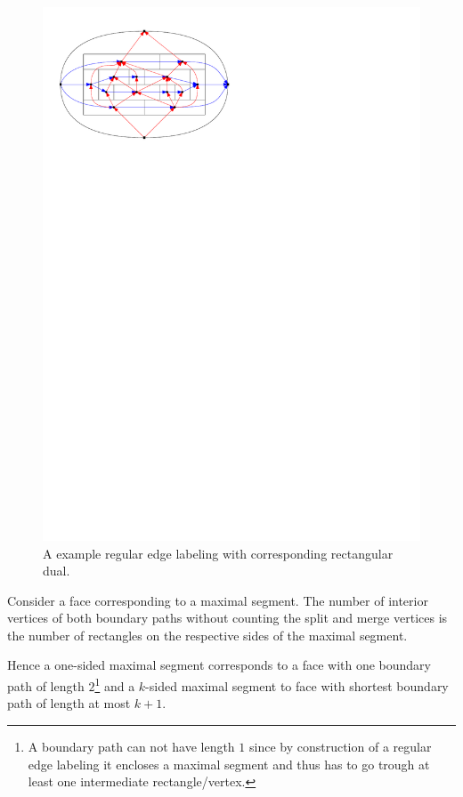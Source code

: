     \begin{figure}[h]
      \centering
      \includegraphics[scale=1]{rectangularDuals/img/relSegmentFaceRescale}
      \caption{A example regular edge labeling with corresponding rectangular dual.}
      \label{fig:rect:relSegmentFace}
    \end{figure}

    Consider a face corresponding to a maximal segment.
    The number of interior vertices of both boundary paths without counting the split and merge vertices is the number of rectangles on the respective sides of the maximal segment.

    Hence a one-sided maximal segment corresponds to a face with one boundary path of length $2$\footnote{A boundary path can not have length $1$ since by construction of a regular edge labeling it encloses a maximal segment and thus has to go trough at least one intermediate rectangle/vertex.} and a $k$-sided maximal segment to face with shortest boundary path of length at most $k+1$.
